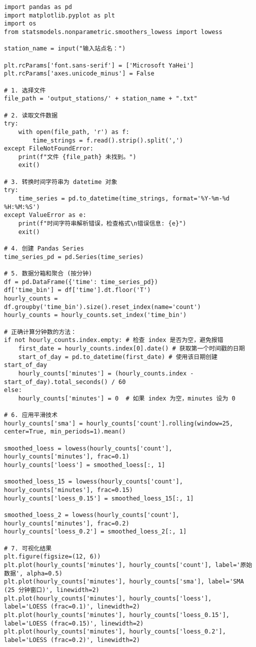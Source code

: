 \begin{lstlisting}[caption={可视化站点数据}]
import pandas as pd
import matplotlib.pyplot as plt
import os
from statsmodels.nonparametric.smoothers_lowess import lowess

station_name = input("输入站点名：")

plt.rcParams['font.sans-serif'] = ['Microsoft YaHei']
plt.rcParams['axes.unicode_minus'] = False

# 1. 选择文件
file_path = 'output_stations/' + station_name + ".txt"

# 2. 读取文件数据
try:
    with open(file_path, 'r') as f:
        time_strings = f.read().strip().split(',')
except FileNotFoundError:
    print(f"文件 {file_path} 未找到。")
    exit()

# 3. 转换时间字符串为 datetime 对象
try:
    time_series = pd.to_datetime(time_strings, format='%Y-%m-%d %H:%M:%S')
except ValueError as e:
    print(f"时间字符串解析错误，检查格式\n错误信息: {e}")
    exit()

# 4. 创建 Pandas Series
time_series_pd = pd.Series(time_series)

# 5. 数据分箱和聚合 (按分钟)
df = pd.DataFrame({'time': time_series_pd})
df['time_bin'] = df['time'].dt.floor('T')
hourly_counts = df.groupby('time_bin').size().reset_index(name='count')
hourly_counts = hourly_counts.set_index('time_bin')

# 正确计算分钟数的方法：
if not hourly_counts.index.empty: # 检查 index 是否为空，避免报错
    first_date = hourly_counts.index[0].date() # 获取第一个时间戳的日期
    start_of_day = pd.to_datetime(first_date) # 使用该日期创建 start_of_day
    hourly_counts['minutes'] = (hourly_counts.index - start_of_day).total_seconds() / 60
else:
    hourly_counts['minutes'] = 0  # 如果 index 为空，minutes 设为 0

# 6. 应用平滑技术
hourly_counts['sma'] = hourly_counts['count'].rolling(window=25, center=True, min_periods=1).mean()

smoothed_loess = lowess(hourly_counts['count'], hourly_counts['minutes'], frac=0.1)
hourly_counts['loess'] = smoothed_loess[:, 1]

smoothed_loess_15 = lowess(hourly_counts['count'], hourly_counts['minutes'], frac=0.15)
hourly_counts['loess_0.15'] = smoothed_loess_15[:, 1]

smoothed_loess_2 = lowess(hourly_counts['count'], hourly_counts['minutes'], frac=0.2)
hourly_counts['loess_0.2'] = smoothed_loess_2[:, 1]

# 7. 可视化结果
plt.figure(figsize=(12, 6))
plt.plot(hourly_counts['minutes'], hourly_counts['count'], label='原始数据', alpha=0.5)
plt.plot(hourly_counts['minutes'], hourly_counts['sma'], label='SMA (25 分钟窗口)', linewidth=2)
plt.plot(hourly_counts['minutes'], hourly_counts['loess'], label='LOESS (frac=0.1)', linewidth=2)
plt.plot(hourly_counts['minutes'], hourly_counts['loess_0.15'], label='LOESS (frac=0.15)', linewidth=2)
plt.plot(hourly_counts['minutes'], hourly_counts['loess_0.2'], label='LOESS (frac=0.2)', linewidth=2)


\end{lstlisting}
